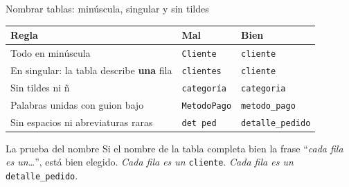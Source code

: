 \documentclass[aspectratio=169,10pt,c]{beamer}
\newcommand{\tbl}[1]{\textcolor{utpNaranja}{\texttt{#1}}}
\begin{document}
\begin{frame}{Nombrar tablas: minúscula, singular y sin tildes}
\begin{center}
\small\setlength\tabcolsep{7pt}
\begin{tabular}{>{\raggedright\arraybackslash}p{5.6cm}p{3.0cm}p{3.0cm}}
\toprule
\bfseries Regla & \bfseries Mal & \bfseries Bien \\
\midrule
Todo en minúscula                    & \texttt{Cliente}        & \tbl{cliente} \\[3pt]
En singular: la tabla describe \textbf{una} fila & \texttt{clientes}       & \tbl{cliente} \\[3pt]
Sin tildes ni ñ                      & \texttt{categoría}      & \tbl{categoria} \\[3pt]
Palabras unidas con guion bajo       & \texttt{MetodoPago}     & \tbl{metodo\_pago} \\[3pt]
Sin espacios ni abreviaturas raras   & \texttt{det ped}        & \tbl{detalle\_pedido} \\
\bottomrule
\end{tabular}
\end{center}
\vspace{0.3cm}
\begin{block}{La prueba del nombre}
\small Si el nombre de la tabla completa bien la frase ``\textit{cada fila es un\ldots}'', está bien elegido. \textit{Cada fila es un} \tbl{cliente}. \textit{Cada fila es un} \tbl{detalle\_pedido}.
\end{block}
\end{frame}
\end{document}
